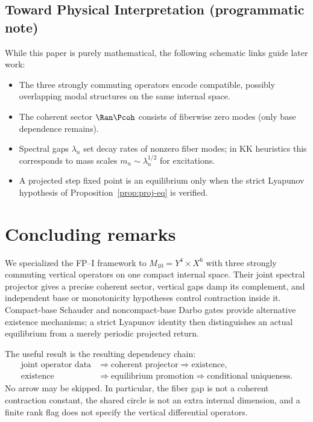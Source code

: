 \documentclass[11pt]{article}
\newcommand{\Mten}{\ensuremath{M_{10}}}
\newcommand{\Yfour}{\ensuremath{Y^{4}}}
\newcommand{\Xsix}{\ensuremath{X^{6}}}
\begin{document}
\subsection{Toward Physical Interpretation (programmatic note)}
While this paper is purely mathematical, the following schematic links guide later work:
\begin{itemize}
\item The three strongly commuting operators encode compatible, possibly
      overlapping modal structures on the same internal space.
\item The coherent sector $\Ran\Pcoh$ consists of fiberwise zero modes (only base dependence remains).
\item Spectral gaps $\lambda_n$ set decay rates of nonzero fiber modes; in KK heuristics this corresponds
      to mass scales $m_n\sim \lambda_n^{1/2}$ for excitations.
\item A projected step fixed point is an equilibrium only when the strict
      Lyapunov hypothesis of Proposition~\ref{prop:proj-eq} is verified.
\end{itemize}

\section{Concluding remarks}
We specialized the FP--I framework to
$\Mten=\Yfour\times\Xsix$ with three strongly commuting vertical operators on
one compact internal space.  Their joint spectral projector gives a precise
coherent sector, vertical gaps damp its complement, and independent base or
monotonicity hypotheses control contraction inside it.  Compact-base
Schauder and noncompact-base Darbo gates provide alternative existence
mechanisms; a strict Lyapunov identity then distinguishes an actual
equilibrium from a merely periodic projected return.

The useful result is the resulting dependency chain:
\[
\begin{aligned}
\text{joint operator data}
&\Longrightarrow \text{coherent projector}
\Longrightarrow \text{existence},\\
\text{existence}
&\Longrightarrow \text{equilibrium promotion}
\Longrightarrow \text{conditional uniqueness}.
\end{aligned}
\]
No arrow may be skipped.  In particular, the fiber gap is not a coherent
contraction constant, the shared circle is not an extra internal dimension,
and a finite rank flag does not specify the vertical differential operators.
\end{document}
